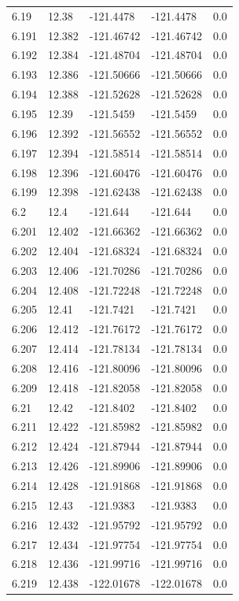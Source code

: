 \begin{tabular}{lllll}
6.19 & 12.38 & -121.4478 & -121.4478 & 0.0 \\
6.191 & 12.382 & -121.46742 & -121.46742 & 0.0 \\
6.192 & 12.384 & -121.48704 & -121.48704 & 0.0 \\
6.193 & 12.386 & -121.50666 & -121.50666 & 0.0 \\
6.194 & 12.388 & -121.52628 & -121.52628 & 0.0 \\
6.195 & 12.39 & -121.5459 & -121.5459 & 0.0 \\
6.196 & 12.392 & -121.56552 & -121.56552 & 0.0 \\
6.197 & 12.394 & -121.58514 & -121.58514 & 0.0 \\
6.198 & 12.396 & -121.60476 & -121.60476 & 0.0 \\
6.199 & 12.398 & -121.62438 & -121.62438 & 0.0 \\
6.2 & 12.4 & -121.644 & -121.644 & 0.0 \\
6.201 & 12.402 & -121.66362 & -121.66362 & 0.0 \\
6.202 & 12.404 & -121.68324 & -121.68324 & 0.0 \\
6.203 & 12.406 & -121.70286 & -121.70286 & 0.0 \\
6.204 & 12.408 & -121.72248 & -121.72248 & 0.0 \\
6.205 & 12.41 & -121.7421 & -121.7421 & 0.0 \\
6.206 & 12.412 & -121.76172 & -121.76172 & 0.0 \\
6.207 & 12.414 & -121.78134 & -121.78134 & 0.0 \\
6.208 & 12.416 & -121.80096 & -121.80096 & 0.0 \\
6.209 & 12.418 & -121.82058 & -121.82058 & 0.0 \\
6.21 & 12.42 & -121.8402 & -121.8402 & 0.0 \\
6.211 & 12.422 & -121.85982 & -121.85982 & 0.0 \\
6.212 & 12.424 & -121.87944 & -121.87944 & 0.0 \\
6.213 & 12.426 & -121.89906 & -121.89906 & 0.0 \\
6.214 & 12.428 & -121.91868 & -121.91868 & 0.0 \\
6.215 & 12.43 & -121.9383 & -121.9383 & 0.0 \\
6.216 & 12.432 & -121.95792 & -121.95792 & 0.0 \\
6.217 & 12.434 & -121.97754 & -121.97754 & 0.0 \\
6.218 & 12.436 & -121.99716 & -121.99716 & 0.0 \\
6.219 & 12.438 & -122.01678 & -122.01678 & 0.0 \\

\end{tabular}
